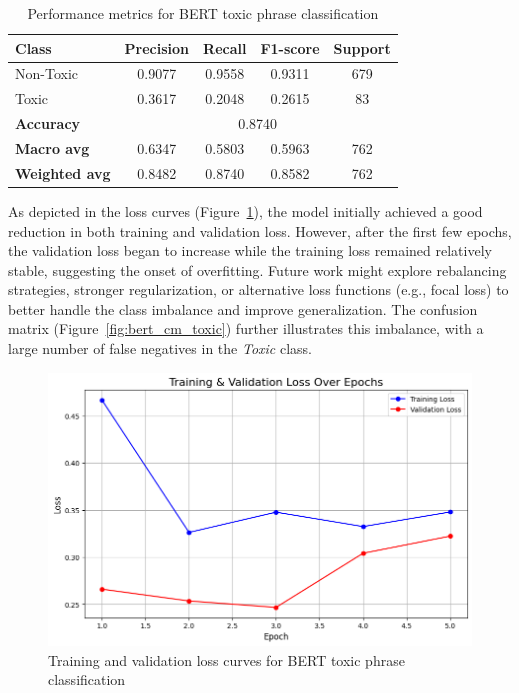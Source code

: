 \documentclass[conference]{IEEEtran}
\begin{document}
\begin{table}[H]
\centering
\caption{Performance metrics for BERT toxic phrase classification}
\begin{tabular}{lcccc}
\toprule
\textbf{Class} & \textbf{Precision} & \textbf{Recall} & \textbf{F1-score} & \textbf{Support} \\
\midrule
Non-Toxic & 0.9077 & 0.9558 & 0.9311 & 679 \\
Toxic & 0.3617 & 0.2048 & 0.2615 & 83 \\
\midrule
\textbf{Accuracy} & \multicolumn{4}{c}{0.8740} \\
\textbf{Macro avg} & 0.6347 & 0.5803 & 0.5963 & 762 \\
\textbf{Weighted avg} & 0.8482 & 0.8740 & 0.8582 & 762 \\
\bottomrule
\end{tabular}
\end{table}

As depicted in the loss curves (Figure~\ref{fig:bert_loss_toxic}), the model initially achieved a good reduction in both training and validation loss. However, after the first few epochs, the validation loss began to increase while the training loss remained relatively stable, suggesting the onset of overfitting. Future work might explore rebalancing strategies, stronger regularization, or alternative loss functions (e.g., focal loss) to better handle the class imbalance and improve generalization. The confusion matrix (Figure~\ref{fig:bert_cm_toxic}) further illustrates this imbalance, with a large number of false negatives in the \emph{Toxic} class.

\begin{figure}[H]
  \centering
  \includegraphics[width=\columnwidth]{figures/bert_toxic_loss_curves.png}
  \caption{Training and validation loss curves for BERT toxic phrase classification}
  \label{fig:bert_loss_toxic}
\end{figure}
\end{document}
